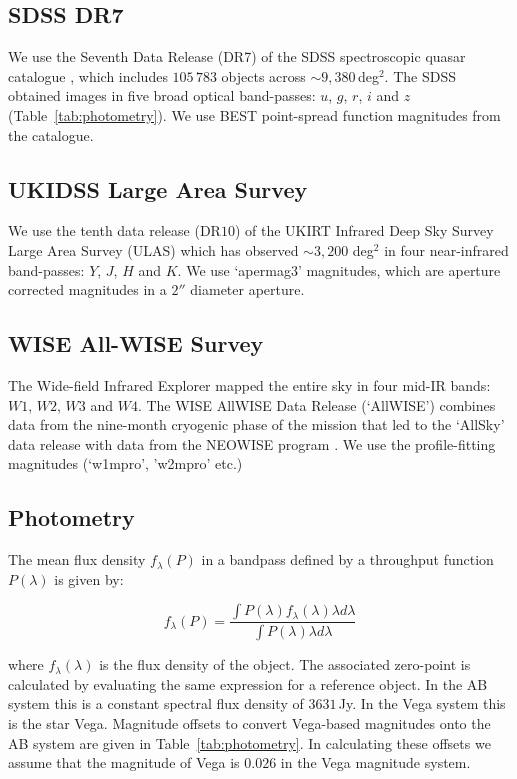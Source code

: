 \subsection{SDSS DR7}

We use the Seventh Data Release (DR7) of the SDSS spectroscopic quasar catalogue \citep{schneider10}, which includes $105\,783$ objects across $\sim 9,380$\,deg$^2$. 
The SDSS obtained images in five broad optical band-passes: $u$, $g$, $r$, $i$ and $z$ (Table~\ref{tab:photometry}).  
We use BEST point-spread function magnitudes from the catalogue.

\subsection{UKIDSS Large Area Survey}

We use the tenth data release (DR$10$) of the UKIRT Infrared Deep Sky Survey \citep[UKIDSS;][]{lawrence07} Large Area Survey (ULAS) which has observed $\sim 3,200$ deg$^2$ in four near-infrared band-passes: $Y$, $J$, $H$ and $K$. 
We use `apermag3' magnitudes, which are aperture corrected magnitudes in a $2''$ diameter aperture.

\subsection{WISE All-WISE Survey}

The Wide-field Infrared Explorer \citep[WISE;][]{wright10} mapped the entire sky in four mid-IR bands: $W1$, $W2$, $W3$ and $W4$. 
The WISE AllWISE Data Release (`AllWISE') combines data from the nine-month cryogenic phase of the mission that led to the `AllSky' data release with data from the NEOWISE program \citep{mainzer11}. 
We use the profile-fitting magnitudes (`w1mpro', 'w2mpro' etc.)  

\subsection{Photometry}

The mean flux density $f_\lambda(P)$ in a bandpass defined by a throughput function $P(\lambda)$ is given by: 

\begin{equation}
  f_\lambda(P) = \frac {\int P(\lambda)f_\lambda(\lambda)\lambda d\lambda} {\int P(\lambda)\lambda d\lambda} 
\end{equation}

where $f_\lambda(\lambda)$ is the flux density of the object. 
The associated zero-point is calculated by evaluating the same expression for a reference object. 
In the AB system \citep{oke83} this is a constant spectral flux density of $3631$\,Jy.
In the Vega system this is the star Vega. 
Magnitude offsets to convert Vega-based magnitudes onto the AB system are given in Table~\ref{tab:photometry}. 
In calculating these offsets we assume that the magnitude of Vega is $0.026$ in the Vega magnitude system. 

